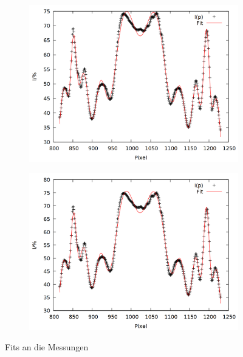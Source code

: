 \begin{figure}\ContinuedFloat
\begin{subfigure}{0.45\textwidth}
\includegraphics[width=\textwidth]{data/zeeman/out_8_4.png}
\end{subfigure}
\begin{subfigure}{0.45\textwidth}
\includegraphics[width=\textwidth]{data/zeeman/out_8_5.png}
\end{subfigure}
\caption{Fits an die Messungen}
\label{fig:raw_fit}
\end{figure}


